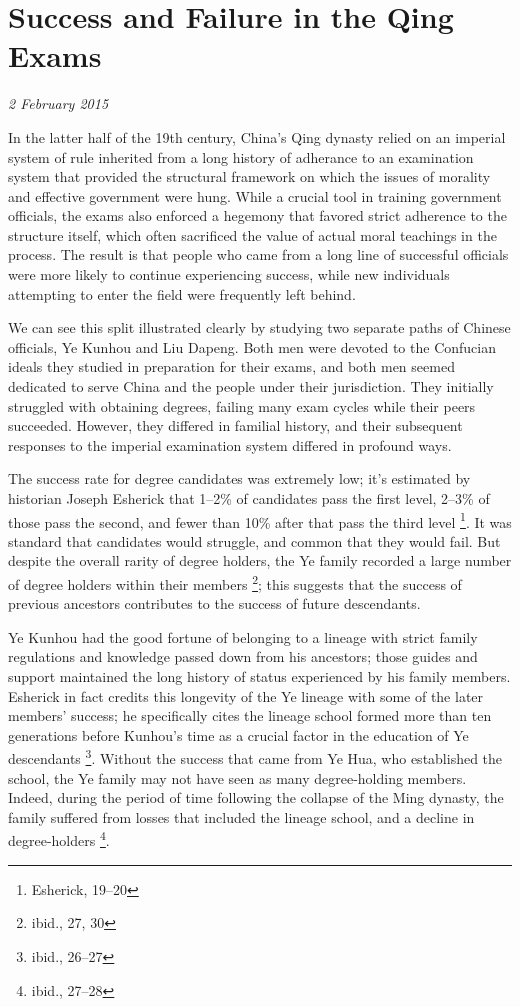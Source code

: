 \section{Success and Failure in the Qing Exams}

\textit{2 February 2015}


In the latter half of the 19th century, China's Qing dynasty relied on an
imperial system of rule inherited from a long history of adherance to an
examination system that provided the structural framework on which the issues
of morality and effective government were hung. While a crucial tool in
training government officials, the exams also enforced a hegemony that
favored strict adherence to the structure itself, which often sacrificed
the value of actual moral teachings in the process. The result is that people who
came from a long line of successful officials were more likely to continue
experiencing success, while new individuals attempting to enter the field were
frequently left behind.

We can see this split illustrated clearly by studying two separate paths of
Chinese officials, Ye Kunhou and Liu Dapeng. Both men were devoted to the
Confucian ideals they studied in preparation for their exams, and both men
seemed dedicated to serve China and the people under their jurisdiction. They
initially struggled with obtaining degrees, failing many exam cycles while
their peers succeeded.  However, they differed in familial history, and their
subsequent responses to the imperial examination system differed in profound
ways.

The success rate for degree candidates was extremely low; it's estimated by
historian Joseph Esherick that 1--2\% of candidates pass the first level,
2--3\% of those pass the second, and fewer than 10\% after that pass the third
level \footnote{Esherick, 19--20}. It was standard that candidates would
struggle, and common that they would fail. But despite the overall rarity of
degree holders, the Ye family recorded a large number of degree holders within
their members \footnote{ibid., 27, 30}; this suggests that the success of
previous ancestors contributes to the success of future descendants.

Ye Kunhou had the good fortune of belonging to a lineage with strict family
regulations and knowledge passed down from his ancestors; those guides and
support maintained the long history of status experienced by his family members.
Esherick in fact credits this longevity of the Ye lineage with some of the later
members' success; he specifically cites the lineage school formed more than
ten generations before Kunhou's time as a crucial factor in the education of Ye
descendants \footnote{ibid., 26--27}. Without the success that came from Ye
Hua, who established the school, the Ye family may not have seen as many
degree-holding members. Indeed, during the period of time following the
collapse of the Ming dynasty, the family suffered from losses that included
the lineage school, and a decline in degree-holders \footnote{ibid., 27--28}.

